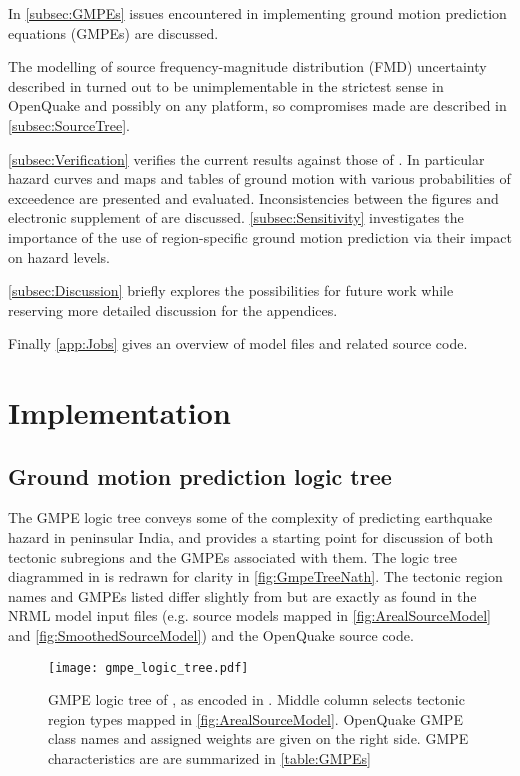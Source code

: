 \documentclass{article}
\begin{document}
In \autoref{subsec:GMPEs} issues encountered in implementing ground motion prediction equations (GMPEs) are discussed.

The modelling of source frequency-magnitude distribution (FMD) uncertainty described in \cite{nath2012probabilistic} turned out to be unimplementable in the strictest sense in OpenQuake and possibly on any platform, so compromises made are described in \autoref{subsec:SourceTree}.

\autoref{subsec:Verification} verifies the current results against those of  \cite{nath2012probabilistic}.
In particular hazard curves and maps and tables of ground motion with various probabilities of exceedence are presented and evaluated.
Inconsistencies between the figures and electronic supplement of \cite{nath2012probabilistic} are discussed.
\autoref{subsec:Sensitivity} investigates the importance of the use of region-specific ground motion prediction via their impact on hazard levels.

\autoref{subsec:Discussion} briefly explores the possibilities for future work while reserving more detailed discussion for the appendices.

Finally \autoref{app:Jobs} gives an overview of model files and related source code.

\section{Implementation}
\label{sec:Implementation}

\subsection{Ground motion prediction logic tree}
\label{subsec:GmpeTree}

The GMPE logic tree conveys some of the complexity of predicting earthquake hazard in peninsular India, and provides a starting point for discussion of both tectonic subregions and the GMPEs associated with them. 
The logic tree diagrammed in  \citet[Figure~3]{nath2012probabilistic} is redrawn for clarity in \autoref{fig:GmpeTreeNath}.
The tectonic region names and GMPEs listed differ slightly from \cite{nath2012probabilistic} but are exactly as found in the NRML model input files (e.g. source models mapped in \autoref{fig:ArealSourceModel} and  \autoref{fig:SmoothedSourceModel}) and the OpenQuake source code.

\begin{figure}
\begin{adjustbox}{center}
\texttt{[image: gmpe\_logic\_tree.pdf]}
\end{adjustbox}
\caption[Original GMPE logic tree]{GMPE logic tree of \cite{nath2012probabilistic}, as encoded in \texttt{}.
Middle column selects tectonic region types mapped in \autoref{fig:ArealSourceModel}.
OpenQuake GMPE class names and assigned weights are given on the right side.
GMPE characteristics are are summarized in \autoref{table:GMPEs}}
\label{fig:GmpeTreeNath}
\end{figure}
\restoregeometry
\end{document}
